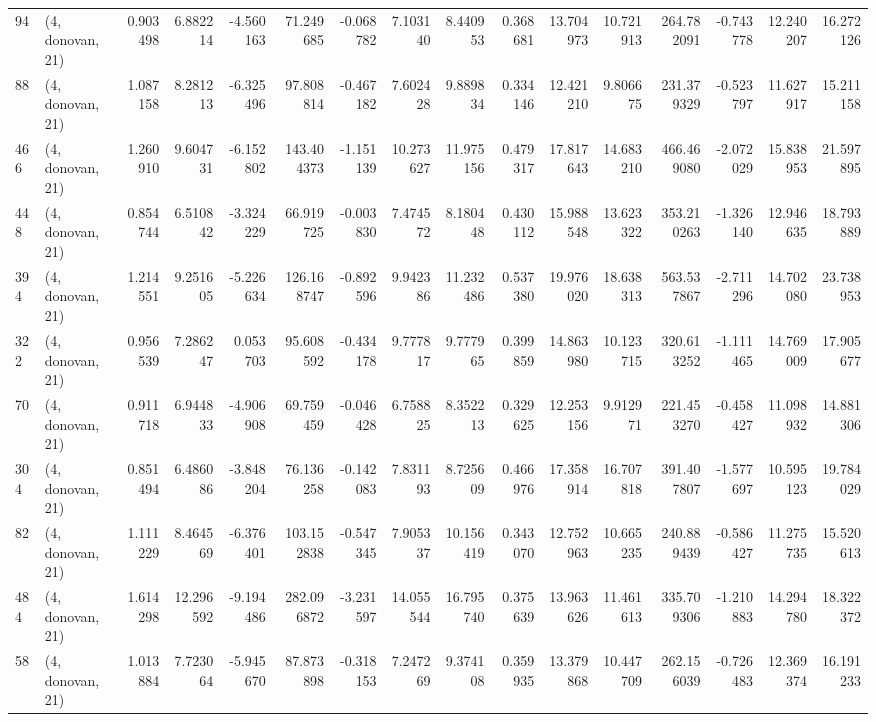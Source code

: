 \begin{tabular}{llrrrrrrrrrrrrrr}
94  &  (4, donovan, 21) &   0.903498 &   6.882214 &  -4.560163 &    71.249685 &  -0.068782 &   7.103140 &   8.440953 &  0.368681 &  13.704973 &  10.721913 &    264.782091 &   -0.743778 &   12.240207 &   16.272126 \\
88  &  (4, donovan, 21) &   1.087158 &   8.281213 &  -6.325496 &    97.808814 &  -0.467182 &   7.602428 &   9.889834 &  0.334146 &  12.421210 &   9.806675 &    231.379329 &   -0.523797 &   11.627917 &   15.211158 \\
466 &  (4, donovan, 21) &   1.260910 &   9.604731 &  -6.152802 &   143.404373 &  -1.151139 &  10.273627 &  11.975156 &  0.479317 &  17.817643 &  14.683210 &    466.469080 &   -2.072029 &   15.838953 &   21.597895 \\
448 &  (4, donovan, 21) &   0.854744 &   6.510842 &  -3.324229 &    66.919725 &  -0.003830 &   7.474572 &   8.180448 &  0.430112 &  15.988548 &  13.623322 &    353.210263 &   -1.326140 &   12.946635 &   18.793889 \\
394 &  (4, donovan, 21) &   1.214551 &   9.251605 &  -5.226634 &   126.168747 &  -0.892596 &   9.942386 &  11.232486 &  0.537380 &  19.976020 &  18.638313 &    563.537867 &   -2.711296 &   14.702080 &   23.738953 \\
322 &  (4, donovan, 21) &   0.956539 &   7.286247 &   0.053703 &    95.608592 &  -0.434178 &   9.777817 &   9.777965 &  0.399859 &  14.863980 &  10.123715 &    320.613252 &   -1.111465 &   14.769009 &   17.905677 \\
70  &  (4, donovan, 21) &   0.911718 &   6.944833 &  -4.906908 &    69.759459 &  -0.046428 &   6.758825 &   8.352213 &  0.329625 &  12.253156 &   9.912971 &    221.453270 &   -0.458427 &   11.098932 &   14.881306 \\
304 &  (4, donovan, 21) &   0.851494 &   6.486086 &  -3.848204 &    76.136258 &  -0.142083 &   7.831193 &   8.725609 &  0.466976 &  17.358914 &  16.707818 &    391.407807 &   -1.577697 &   10.595123 &   19.784029 \\
82  &  (4, donovan, 21) &   1.111229 &   8.464569 &  -6.376401 &   103.152838 &  -0.547345 &   7.905337 &  10.156419 &  0.343070 &  12.752963 &  10.665235 &    240.889439 &   -0.586427 &   11.275735 &   15.520613 \\
484 &  (4, donovan, 21) &   1.614298 &  12.296592 &  -9.194486 &   282.096872 &  -3.231597 &  14.055544 &  16.795740 &  0.375639 &  13.963626 &  11.461613 &    335.709306 &   -1.210883 &   14.294780 &   18.322372 \\
58  &  (4, donovan, 21) &   1.013884 &   7.723064 &  -5.945670 &    87.873898 &  -0.318153 &   7.247269 &   9.374108 &  0.359935 &  13.379868 &  10.447709 &    262.156039 &   -0.726483 &   12.369374 &   16.191233 \\

\end{tabular}
